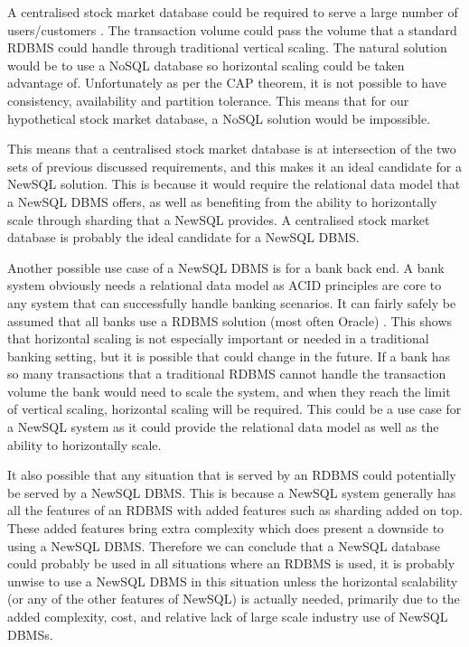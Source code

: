 \documentclass[10pt, conference]{IEEEtran}
\begin{document}
A centralised stock market database could be required to serve a large number of users/customers \cite{stock}. The transaction volume could pass the volume that a standard RDBMS could handle through traditional vertical scaling. The natural solution would be to use a NoSQL database so horizontal scaling could be taken advantage of. Unfortunately as per the CAP theorem, it is not possible to have consistency, availability and partition tolerance. This means that for our hypothetical stock market database, a NoSQL solution would be impossible.

This means that a centralised stock market database is at intersection of the two sets of previous discussed requirements, and this makes it an ideal candidate for a NewSQL solution. This is because it would require the relational data model that a NewSQL DBMS offers, as well as benefiting from the ability to horizontally scale through sharding that a NewSQL provides. A centralised stock market database is probably the ideal candidate for a NewSQL DBMS.

Another possible use case of a NewSQL DBMS is for a bank back end. A bank system obviously needs a relational data model as ACID principles are core to any system that can successfully handle banking scenarios. It can fairly safely be assumed that all banks use a RDBMS solution (most often Oracle) \cite{sta}. This shows that horizontal scaling is not especially important or needed in a traditional banking setting, but it is possible that could change in the future. If a bank has so many transactions that a traditional RDBMS cannot handle the transaction volume the bank would need to scale the system, and when they reach the limit of vertical scaling, horizontal scaling will be required. This could be a use case for a NewSQL system as it could provide the relational data model as well as the ability to horizontally scale.

It also possible that any situation that is served by an RDBMS could potentially be served by a NewSQL DBMS. This is because a NewSQL system generally has all the features of an RDBMS with added features such as sharding added on top. These added features bring extra complexity which does present a downside to using a NewSQL DBMS. Therefore we can conclude that a NewSQL database could probably be used in all situations where an RDBMS is used, it is probably unwise to use a NewSQL DBMS in this situation unless the horizontal scalability (or any of the other features of NewSQL) is actually needed, primarily due to the added complexity, cost, and relative lack of large scale industry use of NewSQL DBMSs.
\end{document}
